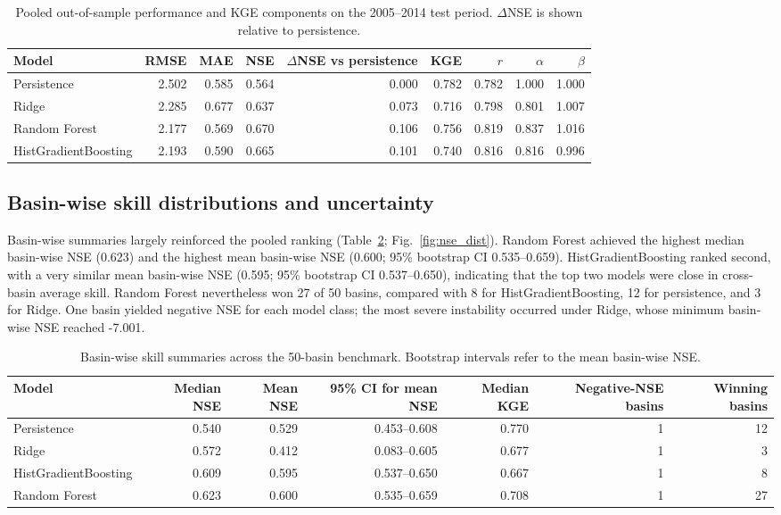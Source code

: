 \documentclass[preprint,12pt,authoryear]{elsarticle}
\begin{document}
\begin{table}[htbp]
\centering
\caption{Pooled out-of-sample performance and KGE components on the 2005--2014 test period. $\Delta$NSE is shown relative to persistence.}
\label{tab:pooled}
\small
\begin{adjustbox}{max width=\textwidth}
\begin{tabular}{lrrrrrrrr}
\toprule
Model & RMSE & MAE & NSE & $\Delta$NSE vs persistence & KGE & $r$ & $\alpha$ & $\beta$ \\
\midrule
Persistence & 2.502 & 0.585 & 0.564 & 0.000 & 0.782 & 0.782 & 1.000 & 1.000 \\
Ridge & 2.285 & 0.677 & 0.637 & 0.073 & 0.716 & 0.798 & 0.801 & 1.007 \\
Random Forest & 2.177 & 0.569 & 0.670 & 0.106 & 0.756 & 0.819 & 0.837 & 1.016 \\
HistGradientBoosting & 2.193 & 0.590 & 0.665 & 0.101 & 0.740 & 0.816 & 0.816 & 0.996 \\
\bottomrule
\end{tabular}
\end{adjustbox}
\end{table}

\subsection{Basin-wise skill distributions and uncertainty}

Basin-wise summaries largely reinforced the pooled ranking (Table~\ref{tab:basinwise}; Fig.~\ref{fig:nse_dist}). Random Forest achieved the highest median basin-wise NSE (0.623) and the highest mean basin-wise NSE (0.600; 95\% bootstrap CI 0.535--0.659). HistGradientBoosting ranked second, with a very similar mean basin-wise NSE (0.595; 95\% bootstrap CI 0.537--0.650), indicating that the top two models were close in cross-basin average skill. Random Forest nevertheless won 27 of 50 basins, compared with 8 for HistGradientBoosting, 12 for persistence, and 3 for Ridge. One basin yielded negative NSE for each model class; the most severe instability occurred under Ridge, whose minimum basin-wise NSE reached -7.001.

\begin{table}[htbp]
\centering
\caption{Basin-wise skill summaries across the 50-basin benchmark. Bootstrap intervals refer to the mean basin-wise NSE.}
\label{tab:basinwise}
\small
\begin{tabular}{lrrrrrr}
\toprule
Model & Median NSE & Mean NSE & 95\% CI for mean NSE & Median KGE & Negative-NSE basins & Winning basins \\
\midrule
Persistence & 0.540 & 0.529 & 0.453--0.608 & 0.770 & 1 & 12 \\
Ridge & 0.572 & 0.412 & 0.083--0.605 & 0.677 & 1 & 3 \\
HistGradientBoosting & 0.609 & 0.595 & 0.537--0.650 & 0.667 & 1 & 8 \\
Random Forest & 0.623 & 0.600 & 0.535--0.659 & 0.708 & 1 & 27 \\
\bottomrule
\end{tabular}
\end{table}
\end{document}
